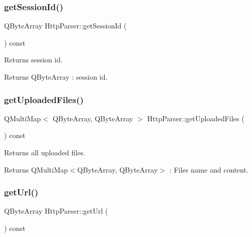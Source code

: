 \subsubsection{\texorpdfstring{get\+Session\+Id()}{getSessionId()}}
{\footnotesize\ttfamily Q\+Byte\+Array Http\+Parser\+::get\+Session\+Id (\begin{DoxyParamCaption}{ }\end{DoxyParamCaption}) const}



Returns session id. 

\begin{DoxyReturn}{Returns}
Q\+Byte\+Array \+: session id. 
\end{DoxyReturn}
\mbox{\label{class_http_parser_a7a887e3a35003a07ba3ec5600260194b}} 
\subsubsection{\texorpdfstring{get\+Uploaded\+Files()}{getUploadedFiles()}}
{\footnotesize\ttfamily Q\+Multi\+Map$<$ Q\+Byte\+Array, Q\+Byte\+Array $>$ Http\+Parser\+::get\+Uploaded\+Files (\begin{DoxyParamCaption}{ }\end{DoxyParamCaption}) const}



Returns all uploaded files. 

\begin{DoxyReturn}{Returns}
Q\+Multi\+Map$<$\+Q\+Byte\+Array, Q\+Byte\+Array$>$ \+: Files name and content. 
\end{DoxyReturn}
\mbox{\label{class_http_parser_a7a1db20efbebf30e1f16004a35ab665f}} 
\subsubsection{\texorpdfstring{get\+Url()}{getUrl()}}
{\footnotesize\ttfamily Q\+Byte\+Array Http\+Parser\+::get\+Url (\begin{DoxyParamCaption}{ }\end{DoxyParamCaption}) const}



